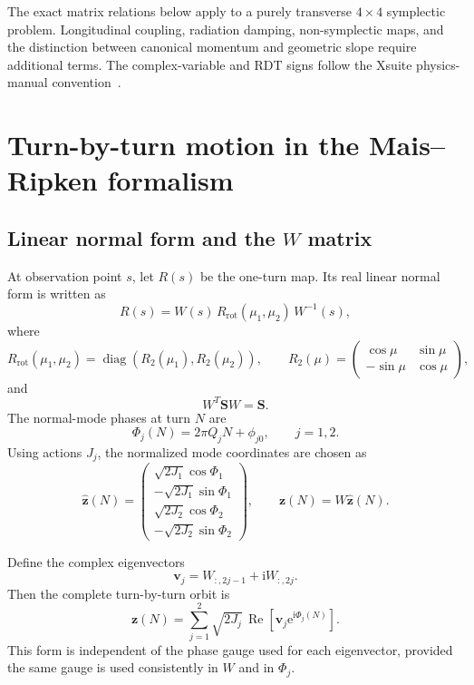 \documentclass[11pt,a4paper]{article}
\newcommand{\ii}{\mathrm{i}}
\newcommand{\e}{\mathrm{e}}
\newcommand{\Ree}{\operatorname{Re}}
\newcommand{\diag}{\operatorname{diag}}
\newcommand{\mat}[1]{\bm{#1}}
\begin{document}
The exact matrix relations below apply to a purely transverse $4\times4$ symplectic problem.  Longitudinal coupling, radiation damping, non-symplectic maps, and the distinction between canonical momentum and geometric slope require additional terms.  The complex-variable and RDT signs follow the Xsuite physics-manual convention~\cite{XsuiteManual}.

\section{Turn-by-turn motion in the Mais--Ripken formalism}
\label{sec:mr}

\subsection{Linear normal form and the $W$ matrix}

At observation point $s$, let $R(s)$ be the one-turn map.  Its real linear normal form is written as
\begin{equation}
 R(s)=W(s)\,R_{\mathrm{rot}}(\mu_1,\mu_2)\,W^{-1}(s),
 \label{eq:normal-form}
\end{equation}
where
\begin{equation}
 R_{\mathrm{rot}}(\mu_1,\mu_2)
 =\diag\!\left(R_2(\mu_1),R_2(\mu_2)\right),
 \qquad
 R_2(\mu)=
 \begin{pmatrix}
  \cos\mu&\sin\mu\\
  -\sin\mu&\cos\mu
 \end{pmatrix},
\end{equation}
and
\begin{equation}
 W^T\mat S W=\mat S.
\end{equation}
The normal-mode phases at turn $N$ are
\begin{equation}
 \Phi_j(N)=2\pi Q_jN+\phi_{j0},
 \qquad j=1,2.
\end{equation}
Using actions $J_j$, the normalized mode coordinates are chosen as
\begin{equation}
 \widehat{\mat z}(N)=
 \begin{pmatrix}
  \sqrt{2J_1}\cos\Phi_1\\
  -\sqrt{2J_1}\sin\Phi_1\\
  \sqrt{2J_2}\cos\Phi_2\\
  -\sqrt{2J_2}\sin\Phi_2
 \end{pmatrix},
 \qquad
 \mat z(N)=W\widehat{\mat z}(N).
 \label{eq:mr-orbit-matrix}
\end{equation}

Define the complex eigenvectors
\begin{equation}
 \mat v_j=W_{:,2j-1}+\ii W_{:,2j}.
\end{equation}
Then the complete turn-by-turn orbit is
\begin{equation}
 \boxed{
 \mat z(N)=\sum_{j=1}^{2}\sqrt{2J_j}\,
 \Ree\!\left[\mat v_j\e^{\ii\Phi_j(N)}\right].
 }
 \label{eq:mr-orbit-complex}
\end{equation}
This form is independent of the phase gauge used for each eigenvector, provided the same gauge is used consistently in $W$ and in $\Phi_j$.
\end{document}
